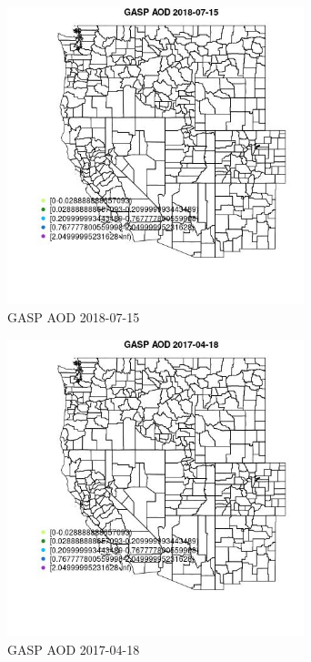 \begin{figure} 
\centering  
\includegraphics[width=0.77\textwidth]{Code_Outputs/Report_ML_input_PM25_Step4_part_e_de_duplicated_aves_compiled_2019-05-20wNAs_MapObsGASP_AOD2018-07-15.jpg} 
\caption{\label{fig:Report_ML_input_PM25_Step4_part_e_de_duplicated_aves_compiled_2019-05-20wNAsMapObsGASP_AOD2018-07-15}GASP AOD 2018-07-15} 
\end{figure} 
 

\begin{figure} 
\centering  
\includegraphics[width=0.77\textwidth]{Code_Outputs/Report_ML_input_PM25_Step4_part_e_de_duplicated_aves_compiled_2019-05-20wNAs_MapObsGASP_AOD2017-04-18.jpg} 
\caption{\label{fig:Report_ML_input_PM25_Step4_part_e_de_duplicated_aves_compiled_2019-05-20wNAsMapObsGASP_AOD2017-04-18}GASP AOD 2017-04-18} 
\end{figure} 
 

